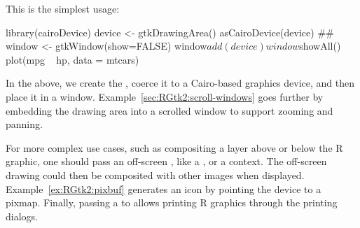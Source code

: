This is the simplest usage:
\begin{Schunk}
\begin{Sinput}
 library(cairoDevice)
 device <- gtkDrawingArea()
 asCairoDevice(device)
 ##
 window <- gtkWindow(show=FALSE)
 window$add(device)
 window$showAll()
 plot(mpg ~ hp, data = mtcars)
\end{Sinput}
\end{Schunk}
%
In the above, we create the , coerce it to a
Cairo-based graphics device, and then place it in a
window. Example~\ref{sec:RGtk2:scroll-windows} goes further by
embedding the drawing area into a scrolled window to support zooming
and panning.

For more complex use cases, such as compositing a layer above or below
the R graphic, one should pass an off-screen , like
a , or a  context. The off-screen
drawing could then be composited with other images when
displayed. Example~\ref{ex:RGtk2:pixbuf} generates an icon by pointing
the device to a pixmap. Finally, passing a  to
 allows printing R graphics through the \GTK\/
printing dialogs.

